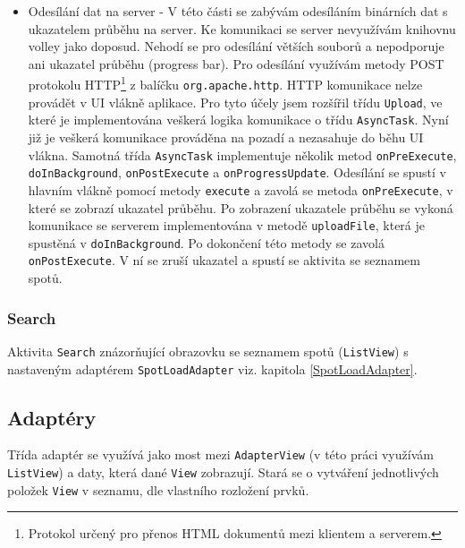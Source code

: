 \documentclass[12pt]{article}
\begin{document}
\begin{itemize}
\item Odesílání dat na server - V této části se zabývám odesíláním binárních dat s ukazatelem průběhu na server. Ke komunikaci se server nevyužívám knihovnu volley jako doposud. Nehodí se pro odesílání větších souborů a nepodporuje ani ukazatel průběhu (progress bar). Pro odesílání využívám metody POST protokolu HTTP\footnote[12]{Protokol určený pro přenos HTML dokumentů mezi klientem a serverem.} z balíčku \verb+org.apache.http+. HTTP komunikace nelze provádět v UI vlákně aplikace. Pro tyto účely jsem rozšířil třídu \verb+Upload+, ve které je implementována veškerá logika komunikace o třídu \verb+AsyncTask+. Nyní již je veškerá komunikace prováděna na pozadí a nezasahuje do běhu UI vlákna. Samotná třída \verb+AsyncTask+ implementuje několik metod \verb+onPreExecute+, \verb+doInBackground+, \verb+onPostExecute+ a \verb+onProgressUpdate+. Odesílání se spustí v hlavním vlákně pomocí metody \verb+execute+ a zavolá se metoda \verb+onPreExecute+, v které se zobrazí ukazatel průběhu. Po zobrazení ukazatele průběhu se vykoná komunikace se serverem implementována v metodě \verb+uploadFile+, která je spustěná v \verb+doInBackground+. Po dokončení této metody se zavolá \verb+onPostExecute+. V ní se zruší ukazatel a spustí se aktivita se seznamem spotů. %
\end{itemize}
\subsubsection{Search}
Aktivita \verb+Search+ znázorňující obrazovku se seznamem spotů (\verb+ListView+) s nastaveným adaptérem \verb+SpotLoadAdapter+ viz. kapitola \ref{SpotLoadAdapter}. 
\subsection{Adaptéry}
Třída adaptér se využívá jako most mezi \verb+AdapterView+ (v této práci využívám \verb+ListView+) a daty, která dané \verb+View+ zobrazují. Stará se o vytváření jednotlivých položek \verb+View+ v seznamu, dle vlastního rozložení prvků. \cite{adapter}
\end{document}
